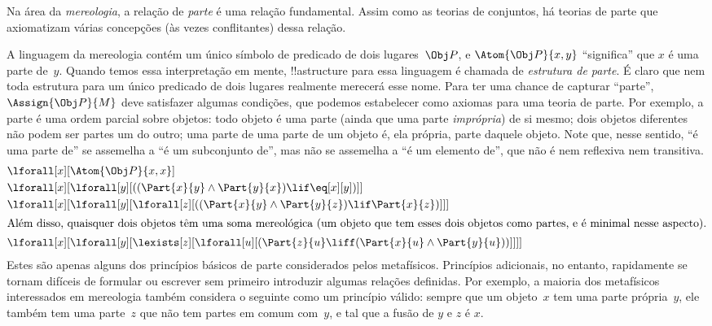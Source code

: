 \documentclass[../../../include/open-logic-section]{subfiles}
\begin{document}
\begin{ex}
Na área da \emph{mereologia}, a relação de \emph{parte} é uma
relação fundamental.  Assim como as teorias de conjuntos, há teorias
de parte que axiomatizam várias concepções (às vezes
conflitantes) dessa relação.

A linguagem da mereologia contém um único símbolo de predicado
de dois lugares~$\Obj P$, e $\Atom{\Obj P}{x, y}$ ``significa'' que $x$ é uma
parte de~$y$.  Quando temos essa interpretação em mente, !!a{structure}
para essa linguagem é chamada de \emph{estrutura de parte}.  É claro que
nem toda estrutura para um único predicado de dois lugares realmente
merecerá esse nome.  Para ter uma chance de capturar ``parte'',
$\Assign{\Obj P}{M}$ deve satisfazer algumas condições, que podemos
estabelecer como axiomas para uma teoria de parte.  Por exemplo, a parte é uma
ordem parcial sobre objetos: todo objeto é uma parte (ainda que uma
parte \emph{imprópria}) de si mesmo; dois objetos diferentes não podem ser partes
um do outro; uma parte de uma parte de um objeto é, ela própria, parte daquele
objeto.  Note que, nesse sentido, ``é uma parte de'' se assemelha a ``é um
subconjunto de'', mas não se assemelha a ``é um elemento de'', que não é
nem reflexiva nem transitiva.
\begin{align*}
& \lforall[x][\Atom{\Obj P}{x,x}] \\
& \lforall[x][\lforall[y][((\Part{x}{y} \land \Part{y}{x})
      \lif \eq[x][y])]] \\
& \lforall[x][\lforall[y][\lforall[z][((\Part{x}{y} \land
        \Part{y}{z}) \lif \Part{x}{z})]]]\\
\intertext{Além disso, quaisquer dois objetos têm uma soma mereológica (um objeto que tem
  esses dois objetos como partes, e é minimal nesse aspecto).}  &
\lforall[x][\lforall[y][\lexists[z][\lforall[u][(\Part{z}{u} \liff
        (\Part{x}{u} \land \Part{y}{u}))]]]]
\end{align*}
Estes são apenas alguns dos princípios básicos de parte considerados pelos
metafísicos.  Princípios adicionais, no entanto, rapidamente se tornam difíceis
de formular ou escrever sem primeiro introduzir algumas relações
definidas.  Por exemplo, a maioria dos metafísicos interessados em mereologia
também considera o seguinte como um princípio válido: sempre que um
objeto~$x$ tem uma parte própria~$y$, ele também tem uma parte~$z$ que não tem
partes em comum com~$y$, e tal que a fusão de $y$ e $z$ é
$x$.
\end{ex}
\end{document}
